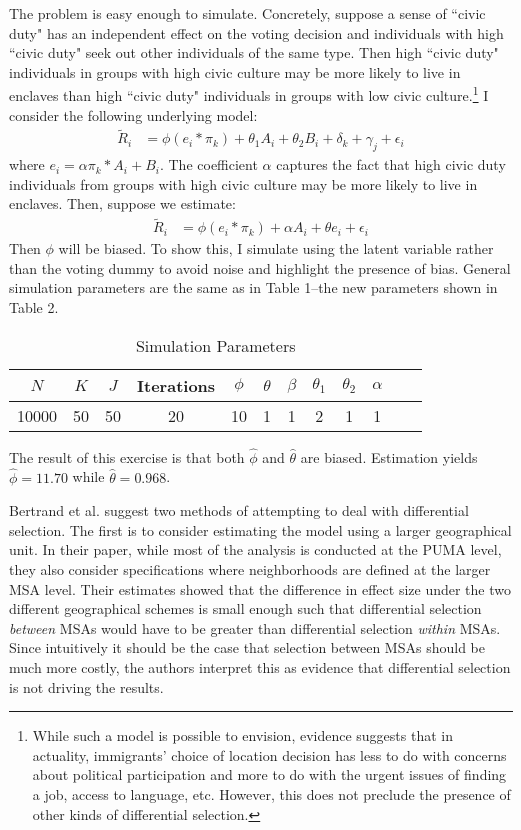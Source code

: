 \documentclass[11pt, oneside]{article}   	%
\newcommand{\eqs}[1]{\begin{align*}#1\end{align*}}
\begin{document}
The problem is easy enough to simulate. Concretely, suppose a sense of ``civic duty" has an independent effect on the voting decision and individuals with high ``civic duty" seek out other individuals of the same type. Then high ``civic duty" individuals in groups with high civic culture may be more likely to live in enclaves than high ``civic duty" individuals in groups with low civic culture.\footnote{While such a model is possible to envision, evidence suggests that in actuality, immigrants' choice of location decision has less to do with concerns about political participation and more to do with the urgent issues of finding a job, access to language, etc. However, this does not preclude the presence of other kinds of differential selection.} I consider the following underlying model:
\eqs{
	\tilde R_i &= \phi (e_i * \pi_k) +  \theta_1 A_i +\theta_2 B_i + \delta_k +\gamma_j + \epsilon_i
}
where $e_i = \alpha \pi_k * A_i + B_i$. The coefficient $\alpha$ captures the fact that high civic duty individuals from groups with high civic culture may be more likely to live in enclaves. Then, suppose we estimate: 
\eqs{
	\tilde R_i &= \phi (e_i * \pi_k) +  \alpha A_i +\theta e_i + \epsilon_i
}
Then $\phi$ will be biased. To show this, I simulate using the latent variable rather than the voting dummy to avoid noise and highlight the presence of bias. General simulation parameters are the same as in Table 1--the new parameters shown in Table 2.

\begin{table}[H] 
\centering 
\caption{Simulation Parameters} 
\begin{tabular}{*{12}c}
\toprule
$N$ & $K$ & $J$ & Iterations &$\phi$ & $\theta$& $\beta$ & $\theta_1$ & $\theta_2$ & $\alpha$  \\
\midrule
10000 & 50 & 50 & 20 & 10 & 1 & 1 & 2 & 1 & 1 \\
\bottomrule
\end{tabular}
\end{table}

The result of this exercise is that both $\hat\phi$ and $\hat\theta$ are biased. Estimation yields $\hat\phi = 11.70$ while $\hat\theta = 0.968$. 

Bertrand et al. suggest two methods of attempting to deal with differential selection. The first is to consider estimating the model using a larger geographical unit. In their paper, while most of the analysis is conducted at the PUMA level, they also consider specifications where neighborhoods are defined at the larger MSA level. Their estimates showed that the difference in effect size under the two different geographical schemes is small enough such that differential selection \emph{between} MSAs would have to be greater than differential selection \emph{within} MSAs. Since intuitively it should be the case that selection between MSAs should be much more costly, the authors interpret this as evidence that differential selection is not driving the results.
\end{document}
